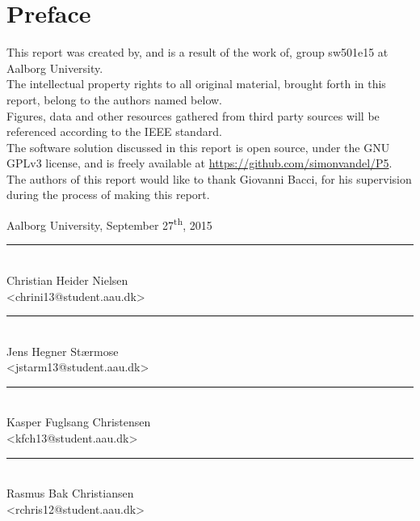 \chapter{Preface}\label{ch:preface}
This report was created by, and is a result of the work of, group sw501e15 at Aalborg University. \\
The intellectual property rights to all original material, brought forth in this report, belong to the authors named below.\\
Figures, data and other resources gathered from third party sources will be referenced according to the IEEE standard. \\
The software solution discussed in this report is open source, under the GNU GPLv3 license, and is freely available at \url{https://github.com/simonvandel/P5}.\\

The authors of this report would like to thank Giovanni Bacci, for his supervision during the process of making this report.

\vspace{\baselineskip}\hfill Aalborg University, September 27\textsuperscript{th}, 2015
\vfill

\noindent
\begin{minipage}[b]{0.45\textwidth}
 \centering
 \rule{\textwidth}{0.5pt}\\
  Christian Heider Nielsen\\
 {\footnotesize <chrini13@student.aau.dk>}
\end{minipage}
%
\hfill
%
\begin{minipage}[b]{0.45\textwidth}
 \centering
 \rule{\textwidth}{0.5pt}\\
  Jens Hegner Stærmose\\
 {\footnotesize <jstarm13@student.aau.dk>}
\end{minipage}
%
\vspace{3\baselineskip}

\noindent
\begin{minipage}[b]{0.45\textwidth}
 \centering
 \rule{\textwidth}{0.5pt}\\
  Kasper Fuglsang Christensen\\
 {\footnotesize <kfch13@student.aau.dk>}
\end{minipage}
%
\hfill
%
\begin{minipage}[b]{0.45\textwidth}
 \centering
 \rule{\textwidth}{0.5pt}\\
  Rasmus Bak Christiansen\\
 {\footnotesize <rchris12@student.aau.dk>}
\end{minipage}
\vspace{3\baselineskip}


